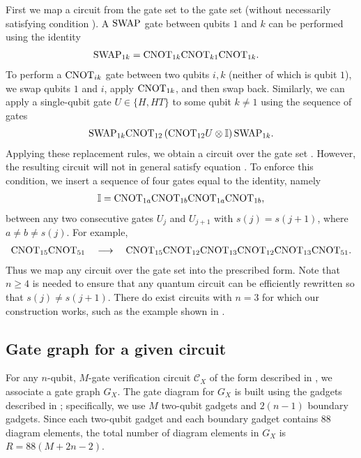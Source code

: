 \documentclass[../thesis-main/thesis-main]{subfiles}
\begin{document}
First we map a circuit from the gate set  to the gate set  (without necessarily satisfying condition ). A $\mathrm{SWAP}$ gate between qubits $1$ and $k$ can be performed using the identity
\begin{align}
  \mathrm{SWAP}_{1k} & = \mathrm{CNOT}_{1k}\mathrm{CNOT}_{k1}\mathrm{CNOT}_{1k}.
\end{align}
To perform a $\mathrm{CNOT}_{ik}$ gate between two qubits $i,k$ (neither of which is qubit $1$), we swap qubits $1$ and $i$, apply $\mathrm{CNOT}_{1k}$, and then swap back. Similarly, we can apply a single-qubit gate $U\in\{H,HT\}$ to some qubit $k\neq1$ using the sequence of gates
\begin{align}
  \mathrm{SWAP}_{1k} \mathrm{CNOT}_{12} \left(\mathrm{CNOT}_{12} U\otimes\mathbb{I}\right) \mathrm{SWAP}_{1k}.
\end{align}
Applying these replacement rules, we obtain a circuit over the gate set . However, the resulting circuit will not in general satisfy equation . To enforce this condition, we insert a sequence of four gates equal to the identity, namely
\begin{align}
  \mathbb{I}=\mathrm{CNOT}_{1a}\mathrm{CNOT}_{1b}\mathrm{CNOT}_{1a}\mathrm{CNOT}_{1b},
\end{align}
between any two consecutive gates $U_j$ and $U_{j+1}$ with $s(j)=s(j+1)$, where $a\neq b \neq s(j)$. For example, 
\begin{align}
\mathrm{CNOT}_{15}\mathrm{CNOT}_{51}\quad\longrightarrow\quad\mathrm{CNOT}_{15}\mathrm{CNOT}_{12}\mathrm{CNOT}_{13}\mathrm{CNOT}_{12}\mathrm{CNOT}_{13}\mathrm{CNOT}_{51}.
\end{align}
Thus we map any circuit over the gate set  into the prescribed form. Note that $n\geq 4$ is needed to ensure that any quantum circuit can be efficiently rewritten so that $s(j) \neq s(j+1)$.  There do exist circuits with $n=3$ for which our construction works, such as the example shown in .

\subsection{Gate graph for a given circuit}\label{sec:g_x_defn}
For any $n$-qubit, $M$-gate verification circuit $\mathcal{C}_{X}$ of the form described in , we associate a gate graph $G_X$. The gate diagram for $G_X$ is built using the gadgets described in ; specifically, we use $M$ two-qubit gadgets and $2(n-1)$ boundary gadgets. Since each two-qubit gadget and each boundary gadget contains $88$ diagram elements, the total number of diagram elements in $G_X$ is $R=88(M+2n-2)$.
\end{document}
